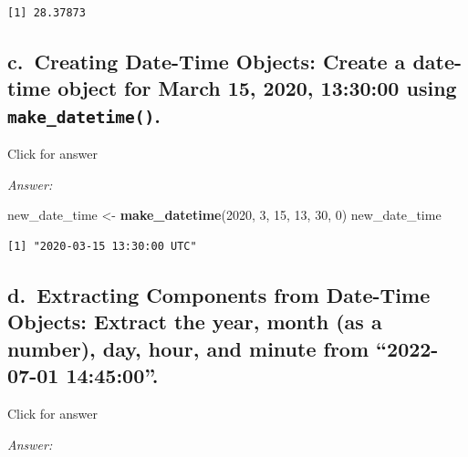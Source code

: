 \documentclass[
]{book}
\newenvironment{Shaded}{\begin{snugshade}}{\end{snugshade}}
\newcommand{\DecValTok}[1]{\textcolor[rgb]{0.00,0.00,0.81}{#1}}
\newcommand{\FunctionTok}[1]{\textcolor[rgb]{0.13,0.29,0.53}{\textbf{#1}}}
\newcommand{\NormalTok}[1]{#1}
\newcommand{\OtherTok}[1]{\textcolor[rgb]{0.56,0.35,0.01}{#1}}
\begin{document}
\begin{verbatim}
[1] 28.37873
\end{verbatim}

\hypertarget{c.-creating-date-time-objects-create-a-date-time-object-for-march-15-2020-133000-using-make_datetime.}{%
\subsection{\texorpdfstring{c.~Creating Date-Time Objects: Create a date-time object for March 15, 2020, 13:30:00 using \texttt{make\_datetime()}.}{c.~Creating Date-Time Objects: Create a date-time object for March 15, 2020, 13:30:00 using make\_datetime().}}\label{c.-creating-date-time-objects-create-a-date-time-object-for-march-15-2020-133000-using-make_datetime.}}

Click for answer

\emph{Answer:}

\begin{Shaded}
\begin{Highlighting}[]
\NormalTok{new\_date\_time }\OtherTok{\textless{}{-}} \FunctionTok{make\_datetime}\NormalTok{(}\DecValTok{2020}\NormalTok{, }\DecValTok{3}\NormalTok{, }\DecValTok{15}\NormalTok{, }\DecValTok{13}\NormalTok{, }\DecValTok{30}\NormalTok{, }\DecValTok{0}\NormalTok{)}
\NormalTok{new\_date\_time}
\end{Highlighting}
\end{Shaded}

\begin{verbatim}
[1] "2020-03-15 13:30:00 UTC"
\end{verbatim}

\hypertarget{d.-extracting-components-from-date-time-objects-extract-the-year-month-as-a-number-day-hour-and-minute-from-2022-07-01-144500.}{%
\subsection{d.~Extracting Components from Date-Time Objects: Extract the year, month (as a number), day, hour, and minute from ``2022-07-01 14:45:00''.}\label{d.-extracting-components-from-date-time-objects-extract-the-year-month-as-a-number-day-hour-and-minute-from-2022-07-01-144500.}}

Click for answer

\emph{Answer:}
\end{document}

